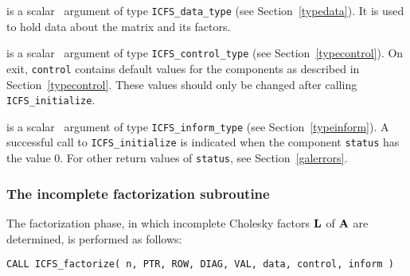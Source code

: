 \documentclass{galahad}
\newcommand{\packagename}{ICFS}
\begin{document}
\vspace*{-3mm}
\begin{description}

 is a scalar \intentinout\ argument of type 
{\tt \packagename\_data\_type}
(see Section~\ref{typedata}). It is used to hold data about the 
matrix and its factors.

 is a scalar \intentout\ argument of type 
{\tt \packagename\_control\_type}
(see Section~\ref{typecontrol}). 
On exit, {\tt control} contains default values for the components as
described in Section~\ref{typecontrol}.
These values should only be changed after calling 
{\tt \packagename\_initialize}.

 is a scalar \intentout\ argument of type 
{\tt \packagename\_inform\_type}
(see Section~\ref{typeinform}). A successful call to
{\tt \packagename\_initialize}
is indicated when the  component {\tt status} has the value 0. 
For other return values of {\tt status}, see Section~\ref{galerrors}.

\end{description}


\subsubsection{The incomplete factorization subroutine}
The factorization phase, in which incomplete Cholesky factors ${\mathbf{L}}$ of 
${\mathbf{A}}$ are determined, is performed as follows:

\vspace*{1mm}

\hspace{8mm}
{\tt CALL \packagename\_factorize( n, PTR, ROW, DIAG, VAL, data, control, inform )}
\end{document}

